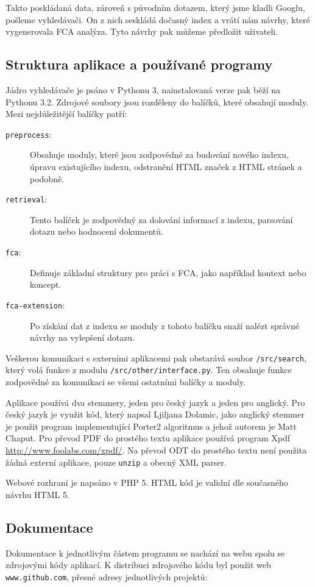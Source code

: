 \documentclass[12pt]{article}
\newcommand{\code}[1]{\texttt{#1}}
\newcommand{\ssection}[1]{\subsection{#1}}
\begin{document}
Takto poskládaná data, zároveň s původním dotazem, který jsme kladli Googlu, pošleme vyhledávači. On z nich seskládá dočasný index a vrátí nám návrhy, které vygenerovala FCA analýza. Tyto návrhy pak můžeme předložit uživateli. 


\ssection{Struktura aplikace a používané programy}
Jádro vyhledávače je psáno v Pythonu 3, nainstalovaná verze pak běží na Pythonu 3.2. Zdrojové soubory jsou rozděleny do balíčků, které obsahují moduly. Mezi nejdůležitější balíčky patří: 

\begin{description}
	\item[\code{preprocess}:] Obsahuje moduly, které jsou zodpovědné za budování nového indexu, úpravu existujícího indexu, odstranění HTML značek z HTML stránek a podobně. 
	\item[\code{retrieval}:] Tento balíček je zodpovědný za dolování informací z indexu, parsování dotazu nebo hodnocení dokumentů. 
	\item[\code{fca}:] Definuje základní struktury pro práci s FCA, jako například kontext nebo koncept. 
	\item[\code{fca-extension}:] Po získání dat z indexu se moduly z tohoto balíčku snaží nalézt správné návrhy na vylepšení dotazu. 
\end{description}

Veškerou komunikaci s externími aplikacemi pak obstarává soubor \code{/src/search}, který volá funkce z modulu \code{/src/other/interface.py}. Ten obsahuje funkce zodpovědné za komunikaci se všemi ostatními balíčky a moduly. 

Aplikace používá dva stemmery, jeden pro český jazyk a jeden pro anglický. Pro český jazyk je využit kód, který napsal Ljiljana Dolamic, jako anglický stemmer je použit program implementující Porter2 algoritmus a jehož autorem je Matt Chaput. Pro převod PDF do prostého textu aplikace používá program Xpdf \url{http://www.foolabs.com/xpdf/}. Na převod ODT do prostého textu není použita žádná externí aplikace, pouze \code{unzip} a obecný XML parser. 

Webové rozhraní je napsáno v PHP 5. HTML kód je validní dle současného návrhu HTML 5. 

\ssection{Dokumentace}\label{ch.dokumentace}
Dokumentace k jednotlivým částem programu se nachází na webu spolu se zdrojovými kódy aplikací. K distribuci zdrojového kódu byl použit web \code{www.github.com}, přesné adresy jednotlivých projektů: 
\end{document}
